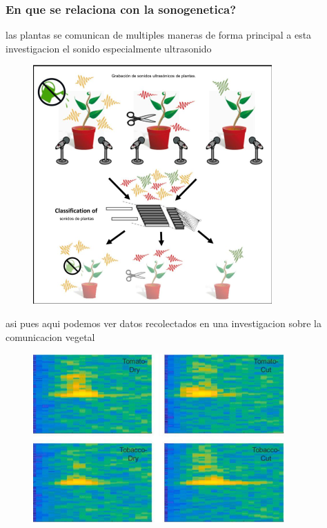 \documentclass[twocolumn]{article}
\begin{document}
\subsubsection{En que se relaciona con la sonogenetica?}las plantas se comunican de multiples maneras
de forma principal a esta investigacion el sonido especialmente ultrasonido 
\begin{figure}
    \centering
    \includegraphics[width=\linewidth]{imagenes/Captura desde 2024-09-25 20-28-13.png}
\end{figure}
asi pues aqui podemos ver datos recolectados en una investigacion sobre la comunicacion vegetal \cite{khait2023sounds}
\begin{figure}
    \centering
    \includegraphics[width=\linewidth]{imagenes/Captura desde 2024-09-25 20-28-50.png}
\end{figure}
\end{document}
